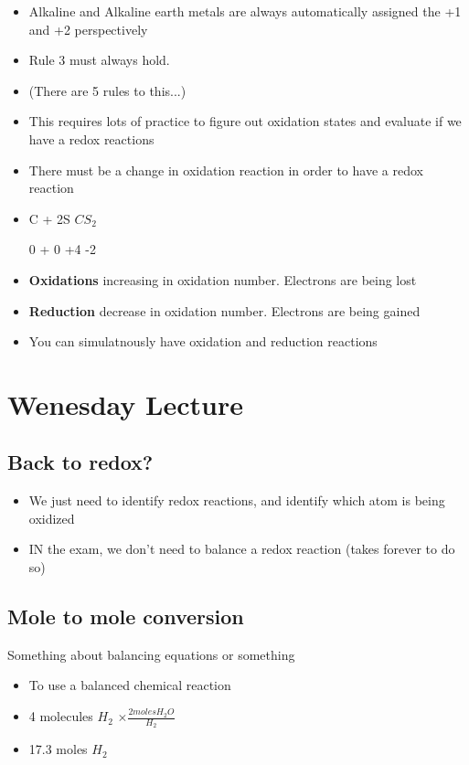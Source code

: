 \documentclass{article}
\begin{document}
\begin{itemize}
  Group 2A metals always have an ox state of +2

  $CaF_2 $, +2 ox state
  \item Alkaline and Alkaline earth metals are always automatically assigned the +1 and +2 perspectively
  \item Rule 3 must always hold.
  \item (There are 5 rules to this...)

  \item This requires lots of practice to figure out oxidation states
    and evaluate if we have a redox reactions
  \item There must be a change in oxidation reaction in order to have a redox reaction
  \item C + 2S \rightarrow{} $CS_2$

    0 + 0 \rightarrow{} +4 -2

  \item \textbf{Oxidations} increasing in oxidation number. Electrons are being lost
  \item \textbf{Reduction} decrease in oxidation number. Electrons are being gained
  \item You can simulatnously have oxidation and reduction reactions

\end{itemize}

\pagebreak

\section{Wenesday Lecture}
\subsection{Back to redox?}
\begin{itemize}
  \item We just need to identify redox reactions, and identify which atom is being oxidized
  \item IN the exam, we don't need to balance a redox reaction (takes forever to do so)
\end{itemize}

\subsection{Mole to mole conversion}
Something about balancing equations or something

\begin{itemize}
  \item To use a balanced chemical reaction
  \item 4 molecules $H_2$ $\times{} \frac{2 moles H_2O}{H_2}$
  \item 17.3 moles $H_2$
\end{itemize}
\end{document}
